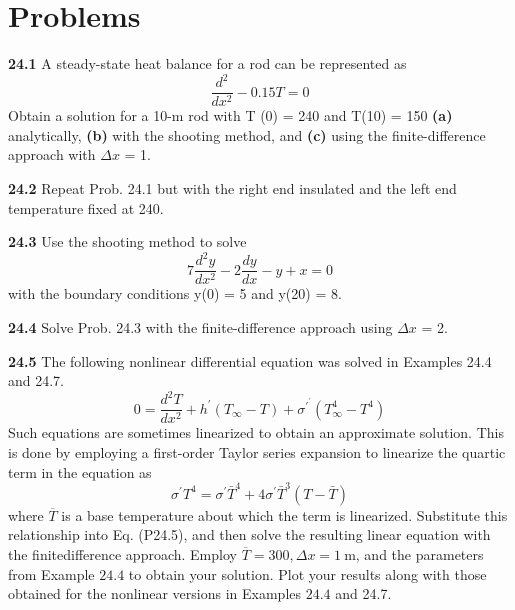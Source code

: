\documentclass[../main.tex]{subfiles}
\begin{document}
\section{Problems}
\begin{multicols}{2}
    \noindent\textbf{24.1} A steady-state heat balance for a rod can be represented as
    $$\frac{d^2}{dx^2}-0.15T=0$$
    Obtain a solution for a 10-m rod with T (0) = 240 and T(10) = 150 \textbf{(a)} analytically, \textbf{(b)} with the shooting method, and \textbf{(c)} using the finite-difference approach with $\Delta x$ = 1.\vspace{2mm}

    \noindent\textbf{24.2} Repeat Prob. 24.1 but with the right end insulated and
    the left end temperature fixed at 240.\vspace{2mm}

    \noindent\textbf{24.3} Use the shooting method to solve
    $$7 \frac{d^{2} y}{d x^{2}}-2 \frac{d y}{d x}-y+x=0$$
    with the boundary conditions y(0) = 5 and y(20) = 8.\vspace{2mm}

    \noindent\textbf{24.4} Solve Prob. 24.3 with the finite-difference approach
    using $\Delta x$ = 2.\vspace{2mm}

    \noindent\textbf{24.5} The following nonlinear differential equation was
    solved in Examples 24.4 and 24.7.\vspace{2mm}
    \begin{equation}
        \tag{P24.5}
        0=\frac{d^{2} T}{d x^{2}}+h^{\prime}\left(T_{\infty}-T\right)+\sigma^{\prime^{\prime}}\left(T_{\infty}^{4}-T^{4}\right)
    \end{equation}
    Such equations are sometimes linearized to obtain an approximate solution. This is done by employing a first-order
    Taylor series expansion to linearize the quartic term in the
    equation as
    $$\sigma^{\prime} T^{4}=\sigma^{\prime} \bar{T}^{4}+4 \sigma^{\prime} \bar{T}^{3}(T-\bar{T})$$
    where $\overline{T}$ is a base temperature about which the term is linearized. Substitute this relationship into Eq. (P24.5), and then solve the resulting linear equation with the finitedifference approach. Employ $\overline{T}=300, \Delta x=1 \mathrm{~m}$, and the parameters from Example $24.4$ to obtain your solution. Plot your results along with those obtained for the nonlinear versions in Examples $24.4$ and 24.7.\vspace{2mm}


\end{multicols}
\end{document}

